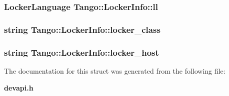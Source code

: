 \subsubsection[{ll}]{\setlength{\rightskip}{0pt plus 5cm}Locker\-Language Tango\-::\-Locker\-Info\-::ll}\label{structTango_1_1LockerInfo_a7a15276bc7ce4c7dd2ff59f8aa67f185}
\subsubsection[{locker\-\_\-class}]{\setlength{\rightskip}{0pt plus 5cm}string Tango\-::\-Locker\-Info\-::locker\-\_\-class}\label{structTango_1_1LockerInfo_a024019267de036847a9f7e30b2c3fe1a}
\subsubsection[{locker\-\_\-host}]{\setlength{\rightskip}{0pt plus 5cm}string Tango\-::\-Locker\-Info\-::locker\-\_\-host}\label{structTango_1_1LockerInfo_ad357dac7c976f8336baeadcf8abafe81}


The documentation for this struct was generated from the following file\-:\begin{DoxyCompactItemize}
\item 
{\bf devapi.\-h}\end{DoxyCompactItemize}
